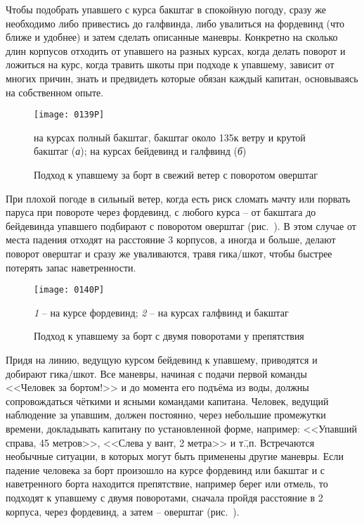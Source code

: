 Чтобы подобрать упавшего с курса бакштаг в спокойную погоду, сразу же
необходимо либо привестись до галфвинда, либо увалиться на фордевинд
(что ближе и удобнее) и затем сделать описанные маневры. Конкретно на
сколько длин корпусов отходить от упавшего на разных курсах, когда
делать поворот и ложиться на курс, когда травить шкоты при подходе к
упавшему, зависит от многих причин, знать и предвидеть которые обязан
каждый капитан, основываясь на собственном опыте.

\begin{figure*}[!htb]
  \centering{}
  \texttt{[image: 0139P]}
  \caption{Подход к упавшему за борт в свежий ветер с поворотом оверштаг}
  \label{fig:139}
  \small
  \centering{}
  на курсах полный бакштаг, бакштаг около 135\gr к ветру и крутой бакштаг (\textit{а}); на курсах бейдевинд и галфвинд (\textit{б})
\end{figure*}

При плохой погоде в сильный ветер, когда есть риск сломать мачту или
порвать паруса при повороте через фордевинд, с любого курса \--- от
бакштага до бейдевинда упавшего подбирают с поворотом оверштаг
(рис.~). В этом случае от места падения отходят на расстояние
3 корпусов, а иногда и больше, делают поворот оверштаг и сразу
же уваливаются, травя гика\-/шкот, чтобы быстрее потерять запас
наветренности.


\begin{figure}[!htb]
  \centering{}
  \texttt{[image: 0140P]}
  \caption{Подход к упавшему за борт с двумя поворотами у препятствия}
  \label{fig:140}
  \small
  \centering{}
  \textit{1} \--- на курсе фордевинд; \textit{2} \--- на курсах галфвинд и бакштаг
\end{figure}

Придя на линию, ведущую курсом бейдевинд к упавшему,
приводятся и добирают гика\-/шкот. Все маневры, начиная с подачи
первой команды <<Человек за бортом!>> и до момента его подъёма из
воды, должны сопровождаться чёткими и ясными командами
капитана. Человек, ведущий наблюдение за упавшим, должен постоянно,
через небольшие промежутки времени, докладывать капитану по
установленной форме, например: <<Упавший справа, 45 метров>>,
<<Слева у вант, 2 метра>> и т.\=,п. Встречаются необычные ситуации, в
которых могут быть применены другие маневры. Если падение человека за
борт произошло на курсе фордевинд или бакштаг и с наветренного борта
находится препятствие, например берег или отмель, то подходят к
упавшему с двумя поворотами, сначала пройдя расстояние в 2
корпуса, через фордевинд, а затем \--- оверштаг (рис.~).

